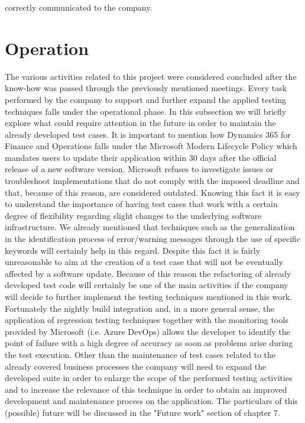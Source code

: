 correctly communicated to the company.

\section{Operation} 

The various activities related to this project were considered concluded after the know-how was passed through the previously mentioned meetings. Every task performed by the company to support and further expand the applied testing techniques falls under the operational phase. In this subsection we will briefly explore what could require attention in the future in order to maintain the already developed test cases. It is important to mention how Dynamics 365 for Finance and Operations falls under the Microsoft Modern Lifecycle Policy which mandates users to update their application within 30 days after the official release of a new software version. Microsoft refuses to investigate issues or troubleshoot implementations that do not comply with the imposed deadline and that, because of this reason, are considered outdated. Knowing this fact it is easy to understand the importance of having test cases that work with a certain degree of flexibility regarding slight changes to the underlying software infrastructure. We already mentioned that techniques such as the generalization in the identification process of error/warning messages through the use of specific keywords will certainly help in this regard. Despite this fact it is fairly unreasonable to aim at the creation of a test case that will not be eventually affected by a software update. Because of this reason the refactoring of already developed test code will certainly be one of the main activities if the company will decide to further implement the testing techniques mentioned in this work. Fortunately the nightly build integration and, in a more general sense, the application of regression testing techniques together with the monitoring tools provided by Microsoft (i.e. Azure DevOps) allows the developer to identify the point of failure with a high degree of accuracy as soon as problems arise during the test execution. Other than the maintenance of test cases related to the already covered business processes the company will need to expand the developed suite in order to enlarge the scope of the performed testing activities and to increase the relevance of this technique in order to obtain an improved development and maintenance process on the application. The particulars of this (possible) future will be discussed in the "Future work" section of chapter 7.